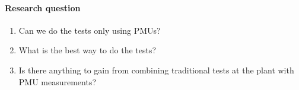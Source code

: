 \begin{frame}{\secname}
	\framesubtitle{Research question}
	\begin{enumerate}
		\item<1-> Can we do the tests only using PMUs?
		\item<2-> What is the best way to do the tests?
		\item<3-> Is there anything to gain from combining traditional tests at the plant with PMU measurements?  
	\end{enumerate}
\end{frame}
